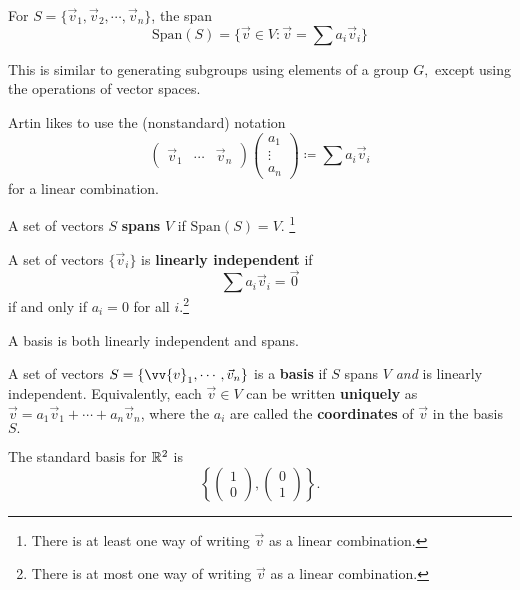 \begin{definition}
For $S = \{\vec{v}_1, \vec{v}_2, \cdots, \vec{v}_n\}$, the span 
\[
\text{Span}(S) = \{\vec{v} \in V: \vec{v} = \sum a_i \vec{v}_i\}
\]
\end{definition}

This is similar to generating subgroups using elements of a group $G,$ except using the operations of vector spaces.

Artin likes to use the (nonstandard) notation 
\[
\begin{pmatrix}
\vec{v}_1 & \cdots & \vec{v}_n
\end{pmatrix}
\begin{pmatrix}
a_1 \\
\vdots \\
a_n
\end{pmatrix}
\coloneqq \sum a_i \vec{v}_i
\]
for a linear combination. 

\begin{definition}
A set of vectors $S$ \textbf{spans} $V$ if $\text{Span}(S) = V.$ \footnote{There is at least one way of writing $\vec{v}$ as a linear combination.}
\end{definition}

\begin{definition}
A set of vectors $\{\vec{v}_i\}$ is \textbf{linearly independent} if 
\[
\sum a_i \vec{v}_i = \vec{0}
\]
if and only if $a_i = 0$ for all $i.$\footnote{There is at most one way of writing $\vec{v}$ as a linear combination.}

\end{definition}

A basis is both linearly independent and spans.
\begin{definition}
A set of vectors $S = \{\vv{v}_1, \cdots, \vec{v}_n\}$ is a \textbf{basis} if $S$ spans $V$ \emph{and} is linearly independent. Equivalently, each $\vec{v} \in V$ can be written \textbf{uniquely} as $\vec{v} = a_1\vec{v}_1 + \cdots + a_n \vec{v}_n$, where the $a_i$ are called the \textbf{coordinates} of $\vec{v}$ in the basis $S.$
\end{definition}

The standard basis for $\mathbb R^2$ is 
\[
\left\{
\begin{pmatrix}
1 \\
0
\end{pmatrix}, 
\begin{pmatrix}
0 \\
1
\end{pmatrix}\right\}.
\]

